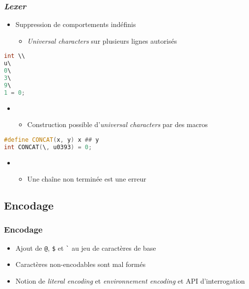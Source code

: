 \documentclass[C++.tex]{subfiles}
\begin{document}
\begin{frame}[fragile]
	\frametitle{\textit{Lexer}}
	\begin{itemize}
		\item Suppression de comportements indéfinis
		\begin{itemize}
			\item \textit{Universal characters} sur plusieurs lignes autorisés
		\end{itemize}
	\end{itemize}
	
	\begin{lstlisting}[language=C++]
int \\
u\
0\
3\
9\
1 = 0;\end{lstlisting}

	\begin{itemize}
		\item [] \begin{itemize}
			\item Construction possible d'\textit{universal characters} par des macros
		\end{itemize}
	\end{itemize}

	\begin{lstlisting}[language=C++]
#define CONCAT(x, y) x ## y
int CONCAT(\, u0393) = 0;\end{lstlisting}

	\begin{itemize}
		\item [] \begin{itemize}
			\item Une chaîne non terminée est une erreur
		\end{itemize}
	\end{itemize}
\end{frame}

\subsection*{Encodage}
\begin{frame}[fragile]
	\frametitle{Encodage}
	\begin{itemize}
		\item Ajout de \lstinline|@|, \lstinline|$| et \lstinline|`| au jeu de caractères de base
	

		\item Caractères non-encodables sont mal formés
		\item Notion de \textit{literal encoding} et \textit{environnement encoding} et API d'interrogation
	\end{itemize}
\end{frame}
\end{document}
